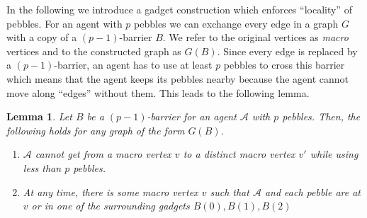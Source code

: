 \documentclass[oneside]{scrartcl}
\newtheorem{lem}{Lemma}
\begin{document}
In the following we introduce a gadget construction which enforces
\enquote{locality} of pebbles. For an agent with $p$ pebbles we can exchange
every edge in a graph $G$ with a copy of a $(p-1)$-barrier $B$. We refer to the
original vertices as \emph{macro} vertices and to the constructed graph as
$G(B)$.  Since every edge is replaced by a $(p-1)$-barrier, an agent has to use
at least $p$ pebbles to cross this barrier which means that the agent keeps its
pebbles nearby because the agent cannot move along \enquote{edges} without
them. This leads to the following lemma.
\begin{lem}
  \label{lem:loc}
  Let $B$ be a $(p-1)$-barrier for an agent $\mathcal{A}$ with $p$ pebbles.
  Then, the following holds for any graph of the form $G(B)$.
  \begin{enumerate}
    \item $\mathcal{A}$ cannot get from a macro vertex $v$ to a distinct
      macro vertex $v'$ while using less than $p$ pebbles.
    \item At any time, there is some macro vertex $v$ such that $\mathcal{A}$
      and each pebble are at $v$ or in one of the surrounding gadgets $B(0),
      B(1), B(2)$
  \end{enumerate}
\end{lem}
\end{document}
